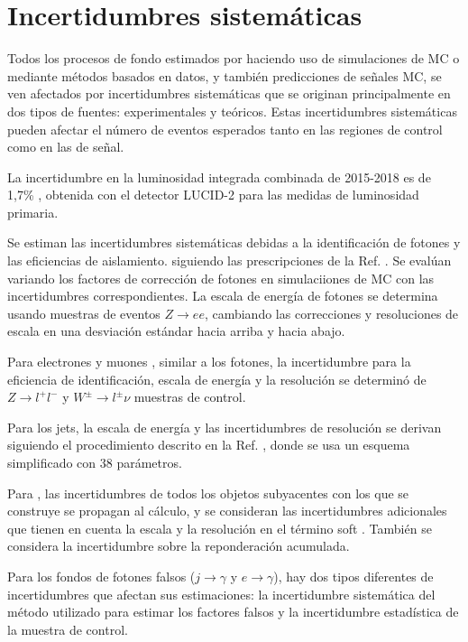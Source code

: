 \section{Incertidumbres sistemáticas}
\label{sec:uncertainties}

Todos los procesos de fondo estimados por
haciendo uso de simulaciones de MC o mediante métodos basados en datos, y también predicciones de señales MC,
se ven afectados por incertidumbres sistemáticas que se originan principalmente en dos tipos de fuentes:
experimentales y teóricos. Estas incertidumbres sistemáticas pueden afectar el número de eventos esperados tanto en las regiones de control como en las de señal.

La incertidumbre en la luminosidad integrada combinada de 2015-2018 es de 1,7\% \cite{ATLAS-CONF-2019-021}, obtenida con el detector LUCID-2 para las medidas de luminosidad primaria.

Se estiman las incertidumbres sistemáticas debidas a la identificación de fotones y las eficiencias de aislamiento.
siguiendo las prescripciones de la Ref. \cite{EGAM-2018-01}. Se evalúan variando los factores de corrección de fotones en simulaciiones de MC con las incertidumbres correspondientes. La escala de energía de fotones se determina usando muestras de eventos $Z \to ee$, cambiando las correcciones y resoluciones de escala en una desviación estándar hacia arriba y hacia abajo.

Para electrones \cite{EGAM-2018-01} y muones \cite{PERF-2015-10}, similar
a los fotones, la incertidumbre para la eficiencia de identificación, escala de energía y
la resolución se determinó de $Z \to l^{+}l^{-}$ y
$W^{\pm}\to l^{\pm}\nu$ muestras de control.

Para los jets, la escala de energía y las incertidumbres de resolución se derivan siguiendo el
procedimiento descrito en la Ref. \cite{PERF-2016-04}, donde se usa un esquema simplificado con 38 parámetros.

Para \met, las incertidumbres de todos los objetos subyacentes con los que se
construye se propagan al cálculo, y se consideran las incertidumbres adicionales que tienen en cuenta la escala y la resolución en el término soft \cite{PERF-2016-07}.
También se considera la incertidumbre sobre la reponderación acumulada.

Para los fondos de fotones falsos ($j\to\gamma$ y $e\to\gamma$), hay
dos tipos diferentes de incertidumbres que afectan sus estimaciones: la incertidumbre sistemática del método utilizado para estimar los factores falsos y la
incertidumbre estadística de la muestra de control.


